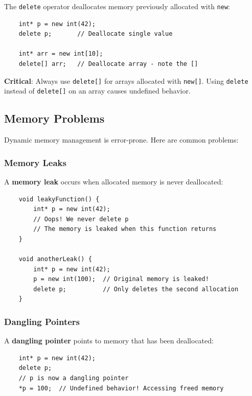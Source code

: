 The \texttt{delete} operator deallocates memory previously allocated with \texttt{new}:

\begin{lstlisting}
	int* p = new int(42);
	delete p;       // Deallocate single value
	
	int* arr = new int[10];
	delete[] arr;   // Deallocate array - note the []
\end{lstlisting}

\begin{remark}
	\textbf{Critical}: Always use \texttt{delete[]} for arrays allocated with \texttt{new[]}. Using \texttt{delete} instead of \texttt{delete[]} on an array causes undefined behavior.
\end{remark}

\subsection{Memory Problems}

Dynamic memory management is error-prone. Here are common problems:

\subsubsection{Memory Leaks}

A \textbf{memory leak} occurs when allocated memory is never deallocated:

\begin{lstlisting}
	void leakyFunction() {
		int* p = new int(42);
		// Oops! We never delete p
		// The memory is leaked when this function returns
	}
	
	void anotherLeak() {
		int* p = new int(42);
		p = new int(100);  // Original memory is leaked!
		delete p;          // Only deletes the second allocation
	}
\end{lstlisting}

\subsubsection{Dangling Pointers}

A \textbf{dangling pointer} points to memory that has been deallocated:

\begin{lstlisting}
	int* p = new int(42);
	delete p;
	// p is now a dangling pointer
	*p = 100;  // Undefined behavior! Accessing freed memory
\end{lstlisting}

